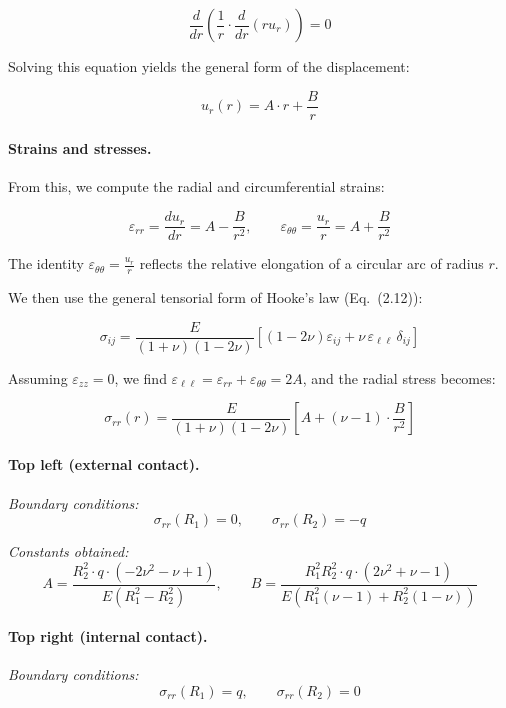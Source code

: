 \documentclass[12pt]{article}
\begin{document}
\[
\frac{d}{dr} \left( \frac{1}{r} \cdot \frac{d}{dr}(r u_r) \right) = 0
\]

Solving this equation yields the general form of the displacement:

\[
u_r(r) = A \cdot r + \frac{B}{r}
\]

\paragraph{Strains and stresses.} From this, we compute the radial and circumferential strains:

\[
\varepsilon_{rr} = \frac{du_r}{dr} = A - \frac{B}{r^2}, \qquad
\varepsilon_{\theta\theta} = \frac{u_r}{r} = A + \frac{B}{r^2}
\]

The identity \( \varepsilon_{\theta\theta} = \frac{u_r}{r} \) reflects the relative elongation of a circular arc of radius \( r \).

We then use the general tensorial form of Hooke’s law (Eq.~(2.12)):

\[
\sigma_{ij} = \frac{E}{(1 + \nu)(1 - 2\nu)} \left[ (1 - 2\nu)\varepsilon_{ij} + \nu \, \varepsilon_{\ell\ell} \, \delta_{ij} \right]
\]

Assuming \( \varepsilon_{zz} = 0 \), we find \( \varepsilon_{\ell\ell} = \varepsilon_{rr} + \varepsilon_{\theta\theta} = 2A \), and the radial stress becomes:

\[
\sigma_{rr}(r) = \frac{E}{(1 + \nu)(1 - 2\nu)} \left[ A + (\nu - 1) \cdot \frac{B}{r^2} \right]
\]
\paragraph{Top left (external contact).}

\textit{Boundary conditions:}
\[
\sigma_{rr}(R_1) = 0, \qquad \sigma_{rr}(R_2) = -q
\]

\textit{Constants obtained:}
\[
A = \frac{R_2^2 \cdot q \cdot (-2\nu^2 - \nu + 1)}{E (R_1^2 - R_2^2)}, \qquad
B = \frac{R_1^2 R_2^2 \cdot q \cdot (2\nu^2 + \nu - 1)}{E (R_1^2 (\nu - 1) + R_2^2 (1 - \nu))}
\]


\vspace{1em}

\paragraph{Top right (internal contact).}

\textit{Boundary conditions:}
\[
\sigma_{rr}(R_1) = q, \qquad \sigma_{rr}(R_2) = 0
\]
\end{document}
